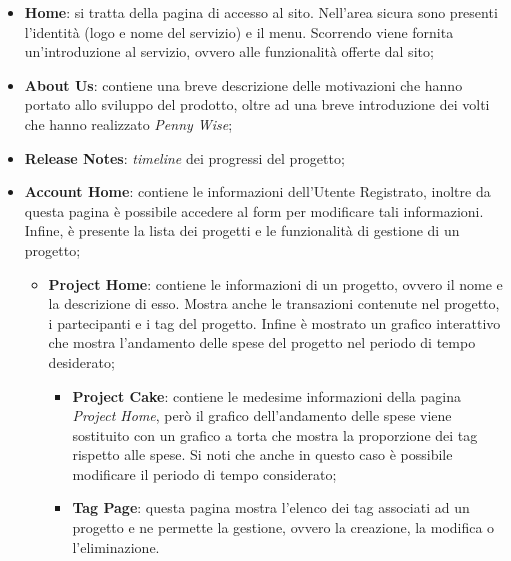 \begin{itemize}
    \item \textbf{Home}: si tratta della pagina di accesso al sito. Nell'area sicura sono presenti l'identità (logo e nome del servizio) e il menu. Scorrendo viene fornita un'introduzione al servizio, ovvero alle funzionalità offerte dal sito;

    \item \textbf{About Us}: contiene una breve descrizione delle motivazioni che hanno portato allo sviluppo del prodotto, oltre ad una breve introduzione dei volti che hanno realizzato \textit{Penny Wise};

    \item \textbf{Release Notes}: \textit{timeline} dei progressi del progetto;

    \item \textbf{Account Home}: contiene le informazioni dell'Utente Registrato, inoltre da questa pagina è possibile accedere al form per modificare tali informazioni. Infine, è presente la lista dei progetti e le funzionalità di gestione di un progetto;
    
    \begin{itemize}
        \item \textbf{Project Home}: contiene le informazioni di un progetto, ovvero il nome e la descrizione di esso. Mostra anche le transazioni contenute nel progetto, i partecipanti e i tag del progetto. Infine è mostrato un grafico interattivo che mostra l'andamento delle spese del progetto nel periodo di tempo desiderato;
        
        \begin{itemize}
            \item \textbf{Project Cake}: contiene le medesime informazioni della pagina \textit{Project Home}, però il grafico dell'andamento delle spese viene sostituito con un grafico a torta che mostra la proporzione dei tag rispetto alle spese. Si noti che anche in questo caso è possibile modificare il periodo di tempo considerato;

            \item \textbf{Tag Page}: questa pagina mostra l'elenco dei tag associati ad un progetto e ne permette la gestione, ovvero la creazione, la modifica o l'eliminazione.
        \end{itemize}
    \end{itemize}
\end{itemize}

